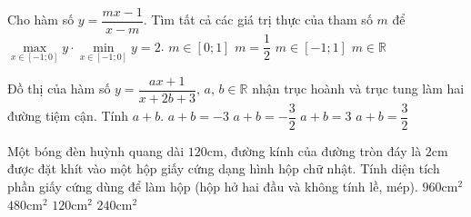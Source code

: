 \begin{ex}%
Cho hàm số $y=\dfrac{mx-1}{x-m}$. Tìm tất cả các giá trị thực của tham số $m$ để $\mathop{\max}\limits_{x\in[-1;0]}y\cdot\mathop{\min}\limits_{x\in[-1;0]}y=2$. 
\choice
{$m\in[0;1]$}
{\True $m=\dfrac{1}{2}$}
{$m\in[-1;1]$}
{$m\in\mathbb{R}$}
\end{ex}
\begin{ex}%
Đồ thị của hàm số $y=\dfrac{ax+1}{x+2b+3}$, $a$, $b\in\mathbb{R}$ nhận trục hoành và trục tung làm hai đường tiệm cận. Tính $a+b$. 
\choice
{$a+b=-3$}
{\True $a+b=-\dfrac{3}{2}$}
{$a+b=3$}
{$a+b=\dfrac{3}{2}$}
\end{ex}
\begin{ex}%
Một bóng đèn huỳnh quang dài $120$cm, đường kính của đường tròn đáy là $2$cm được đặt khít vào một hộp giấy cứng dạng hình hộp chữ nhật. Tính diện tích phần giấy cứng dùng để làm hộp (hộp hở hai đầu và không tính lề, mép). 
\choice
{\True $960$cm$^2$}
{$480$cm$^2$}
{$120$cm$^2$}
{$240$cm$^2$}
\end{ex}
